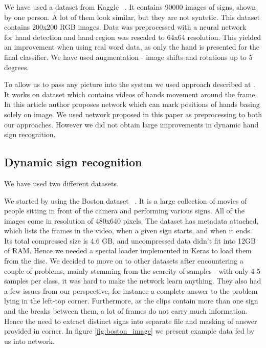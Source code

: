 \documentclass[10pt,twocolumn,letterpaper]{article}
\begin{document}
We have used a dataset from Kaggle ~\cite{ASL_dataset}. It contains 90000 images of signs,
shown by one person. A lot of them look similar, but they are not syntetic. This dataset contains 200x200 RGB images. Data was
preprocessed with a neural network ~\cite{HandDetection} for hand detection and hand region
was rescaled to 64x64 resolution. This yielded an improvement
when using real word data, as only the hand is presented for the final classifier.
We have used augmentation - image shifts and rotations up to 5 degrees.

To allow us to pass any picture into the system we used approach described at \cite{Handtrack_dibia}.
It works on dataset which contains videos of hands movement around the frame. 
In this article author proposes network which can mark positions of hands basing solely on image.
We used network proposed in this paper as preprocessing to both our approaches.
However we did not obtain large improvements in dynamic hand sign recognition.

\subsection{Dynamic sign recognition}

We have used two different datasets.

We started by using the Boston dataset ~\cite{Boston_dynamic_signs, Boston_signs_article_1, Boston_signs_article_2}. 
It is a large collection of movies of people sitting in front of the camera and performing various signs. All of the images come in resolution of 480x640 pixels.
The dataset has metadata attached, which lists the frames in the video, when a given sign starts, and when it ends.
Its total compressed size is 4.6 GB, and uncompressed data didn't fit into 12GB of RAM.
Hence we needed a special loader implemented in Keras to load them from the disc.
We decided to move on to other datasets after encountering a couple of problems, mainly stemming from the scarcity of samples
- with only 4-5 samples per class, it was hard to make the network learn anything.
They also had a few issues from our perspective, for instance a complete answer to the problem lying in the left-top corner.
Furthermore, as the clips contain more than one sign and the breaks between them, a lot of frames do not carry much information.
Hence the need to extract distinct signs into separate file and masking of answer provided in corner.
In figure \ref{fig:boston_image} we present example data fed by us into network.
\end{document}
